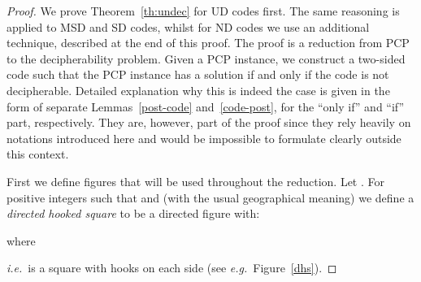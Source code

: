 \documentclass[final,nomarks]{dmtcs-episciences}
\begin{document}
\begin{proof}
We prove Theorem~\ref{th:undec} for UD codes first. The same reasoning is applied 
to MSD and SD codes, whilst for ND codes we use an additional technique,
described at the end of this proof. The proof is a reduction from
PCP to the decipherability problem. Given a PCP instance, we construct a two-sided
code such that the PCP instance has a solution if and only if the code is not decipherable.
Detailed explanation why this is indeed the case is given in the form of separate
Lemmas~\ref{post-code} and~\ref{code-post}, for the ``only if'' and ``if'' part, respectively.
They are, however, part of the proof since they rely heavily on
notations introduced here and would be impossible to formulate clearly
outside this context.

First we define figures that will be used throughout the reduction.
Let .
For positive integers  such that  
and  (with the usual geographical meaning) we define 
a \emph{directed hooked square} 
to be a directed figure  with:

where

\textit{i.e.}\  is a square with hooks on each side (see
\textit{e.g.}\ Figure~\ref{dhs}).


\end{proof}
\end{document}
